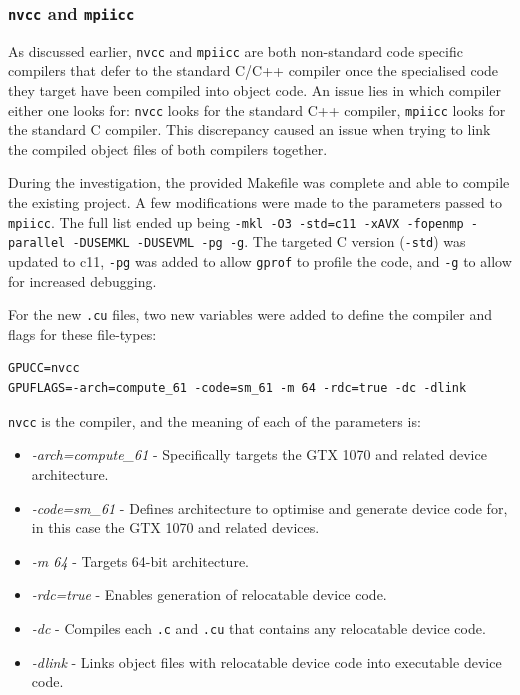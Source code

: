 \documentclass[conference]{IEEEtran}
\begin{document}
\subsubsection{\texttt{nvcc} and \texttt{mpiicc}}

As discussed earlier, \texttt{nvcc} and \texttt{mpiicc} are both non-standard code specific compilers that defer to the standard C/C++ compiler once the specialised code they target have been compiled into object code. An issue lies in which compiler either one looks for: \texttt{nvcc} looks for the standard C++ compiler, \texttt{mpiicc} looks for the standard C compiler. This discrepancy caused an issue when trying to link the compiled object files of both compilers together.

During the investigation, the provided Makefile was complete and able to compile the existing project. A few modifications were made to the parameters passed to \texttt{mpiicc}. The full list ended up being \texttt{-mkl -O3 -std=c11 -xAVX -fopenmp -parallel -DUSEMKL -DUSEVML -pg -g}. The targeted C version (\texttt{-std}) was updated to c11, \texttt{-pg} was added to allow \texttt{gprof} to profile the code, and \texttt{-g} to allow for increased debugging.

For the new \texttt{.cu} files, two new variables were added to define the compiler and flags for these file-types:

\begin{lstlisting}[breaklines]
GPUCC=nvcc
GPUFLAGS=-arch=compute_61 -code=sm_61 -m 64 -rdc=true -dc -dlink
\end{lstlisting}

\texttt{nvcc} is the compiler, and the meaning of each of the parameters is:

\begin{itemize}
    \item \textit{-arch=compute\_61} - Specifically targets the GTX 1070 and related device architecture.
    \item \textit{-code=sm\_61} - Defines architecture to optimise and generate device code for, in this case the GTX 1070 and related devices. 
    \item \textit{-m 64} - Targets 64-bit architecture.
    \item \textit{-rdc=true} - Enables generation of relocatable device code.
    \item \textit{-dc} - Compiles each \texttt{.c} and \texttt{.cu} that contains any relocatable device code.
    \item \textit{-dlink} - Links object files with relocatable device code into executable device code.
\end{itemize}
\end{document}
